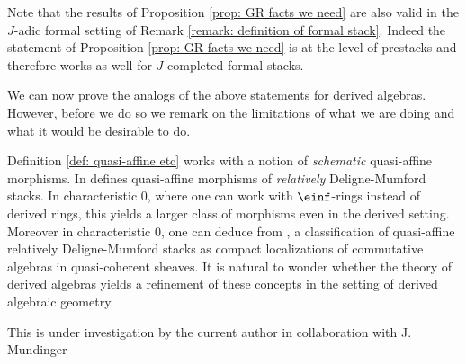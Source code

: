 \documentclass[10pt,reqno]{amsart}
\numberwithin{equation}{section}
\begin{document}
\begin{remark}\label{remark: pushforward also work for formal stacks}
    Note that the results of Proposition \ref{prop: GR facts we need} are also valid in the $J$-adic formal setting of Remark \ref{remark: definition of formal stack}. Indeed the statement of Proposition \ref{prop: GR facts we need} is at the level of prestacks and therefore works as well for $J$-completed formal stacks.
\end{remark}

We can now prove the analogs of the above statements for derived algebras. However, before we do so we remark on the limitations of what we are doing and what it would be desirable to do. 

\begin{remark}\label{remark: limitations of quasi-affine}
    Definition \ref{def: quasi-affine etc} works with a notion of \emph{schematic} quasi-affine morphisms. In \cite[Definition 3.1.24]{Lurie2011DAGVIII} defines quasi-affine morphisms of \emph{relatively} Deligne-Mumford stacks. In characteristic $0$, where one can work with $\einf$-rings instead of derived rings, this yields a larger class of morphisms even in the derived setting.
    Moreover in characteristic $0$, one can deduce from \cite[Theorem 2.3]{BhattHalpernLeistner2017TannakaRevisited}, a classification of quasi-affine relatively Deligne-Mumford stacks as compact localizations of commutative algebras in quasi-coherent sheaves. 
    It is natural to wonder whether the theory of derived algebras yields a refinement of these concepts in the setting of derived algebraic geometry. 
    
    This is under investigation by the current author in collaboration with J. Mundinger \cite{MundingerSahai_inprep}
\end{remark}
\end{document}
